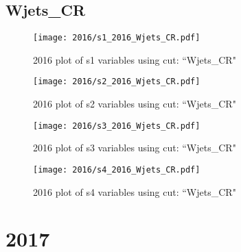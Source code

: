 \documentclass{article}
\begin{document}
      \subsection*{Wjets\_CR}
                        \begin{figure}[H]
                            \centering
                            \caption{2016 plot of s1 variables using cut: ``Wjets\_CR"}
                            \texttt{[image: 2016/s1\_2016\_Wjets\_CR.pdf]}
                        \end{figure}    
                        \begin{figure}[H]
                            \centering
                            \caption{2016 plot of s2 variables using cut: ``Wjets\_CR"}
                            \texttt{[image: 2016/s2\_2016\_Wjets\_CR.pdf]}
                        \end{figure}    
                        \begin{figure}[H]
                            \centering
                            \caption{2016 plot of s3 variables using cut: ``Wjets\_CR"}
                            \texttt{[image: 2016/s3\_2016\_Wjets\_CR.pdf]}
                        \end{figure}    
                        \begin{figure}[H]
                            \centering
                            \caption{2016 plot of s4 variables using cut: ``Wjets\_CR"}
                            \texttt{[image: 2016/s4\_2016\_Wjets\_CR.pdf]}
                        \end{figure}    
    \section*{2017}
\end{document}
